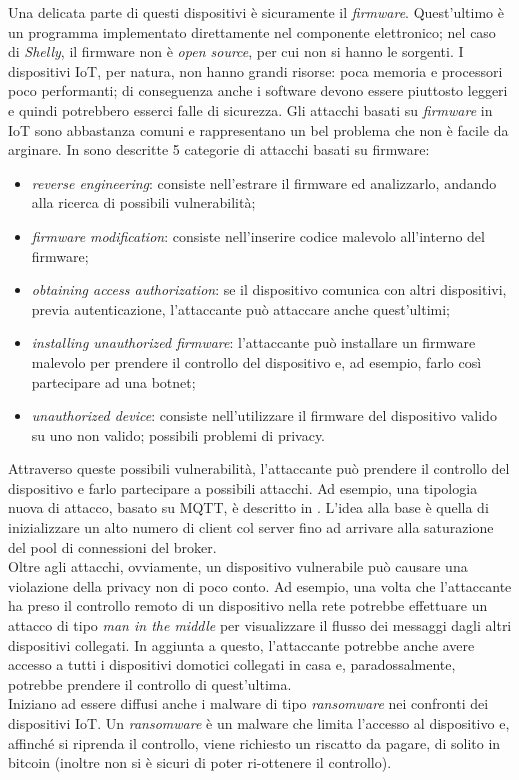 \documentclass[binding=0.6cm,TFA]{sapthesis}
\begin{document}
\begin{large}
Una delicata parte di questi dispositivi è sicuramente il \textit{firmware}. Quest'ultimo è un programma implementato direttamente nel componente elettronico; nel caso di \textit{Shelly}, il firmware non è \textit{open source}, per cui non si hanno le sorgenti. I dispositivi IoT, per natura, non hanno grandi risorse: poca memoria e processori poco performanti; di conseguenza anche i software devono essere piuttosto leggeri e quindi potrebbero esserci falle di sicurezza. Gli attacchi basati su \textit{firmware} in IoT sono abbastanza comuni e rappresentano un bel problema che non è facile da arginare. In \cite{firmwareattack} sono descritte 5 categorie di attacchi basati su firmware:
\begin{itemize}
\item \textit{reverse engineering}: consiste nell'estrare il firmware ed analizzarlo, andando alla ricerca di possibili vulnerabilità;
\item \textit{firmware modification}: consiste nell'inserire codice malevolo all'interno del firmware;
\item \textit{obtaining access authorization}: se il dispositivo comunica con altri dispositivi, previa autenticazione, l'attaccante può attaccare anche quest'ultimi;
\item \textit{installing unauthorized firmware}: l'attaccante può installare un firmware malevolo per prendere il controllo del dispositivo e, ad esempio, farlo così partecipare ad una botnet;
\item \textit{unauthorized device}: consiste nell'utilizzare il firmware del dispositivo valido su uno non valido; possibili problemi di privacy. \\
\end{itemize}

Attraverso queste possibili vulnerabilità, l'attaccante può prendere il controllo del dispositivo e farlo partecipare a possibili attacchi. Ad esempio, una tipologia nuova di attacco, basato su MQTT, è descritto in \cite{articleSlowITe}. L'idea alla base è quella di inizializzare un alto numero di client col server fino ad arrivare alla saturazione del pool di connessioni del broker. \\

Oltre agli attacchi, ovviamente, un dispositivo vulnerabile può causare una violazione della privacy non di poco conto. Ad esempio, una volta che l'attaccante ha preso il controllo remoto di un dispositivo nella rete potrebbe effettuare un attacco di tipo \textit{man in the middle} per visualizzare il flusso dei messaggi dagli altri dispositivi collegati. In aggiunta a questo, l'attaccante potrebbe anche avere accesso a tutti i dispositivi domotici collegati in casa e, paradossalmente, potrebbe prendere il controllo di quest'ultima. \\

Iniziano ad essere diffusi anche i malware di tipo \textit{ransomware} nei confronti dei dispositivi IoT. Un \textit{ransomware} è un malware che limita l'accesso al dispositivo e, affinché si riprenda il controllo, viene richiesto un riscatto da pagare, di solito in bitcoin (inoltre non si è sicuri di poter ri-ottenere il controllo).
\end{large}
\end{document}
